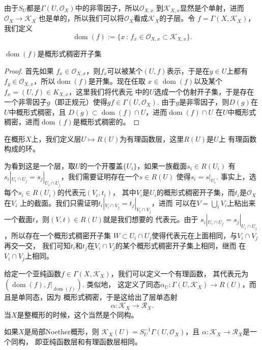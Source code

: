 由于$S_U$都是$\Gamma(U,\mathcal O_X)$中的非零因子，所以$\mathcal O_{X,x}$
到$\mathcal K_{X,x}$显然是个单射，进而$\mathcal O_{X}\to \mathcal K_{X}$
也是单的，所以我们可以将$\mathcal O_{X}$看成$\mathcal K_{X}$的子层。令
$f=\Gamma(X,\mathcal K_{X})$，我们定义
\[
    \operatorname{dom}(f):=\{x\,:\,f_x\in \mathcal O_{X,x}
    \subset \mathcal K_{X,x}\}.
\]

\begin{lem}
    $\operatorname{dom}(f)$是概形式稠密开子集
\end{lem}

\begin{proof}
首先如果
$f_x\in \mathcal O_{X,x}$，则$f_x$可以被某个$(U,f)$表示，于是在$y\in U$上都有
$f_y\in \mathcal O_{X,x}$，所以$\operatorname{dom}(f)$是开集。现在任取
$x\in \operatorname{dom}(f)$以及某个$f_x=(U,f)\in K_{X,x}$，这里我们将代表元
中的$U$选成一个仿射开子集，于是存在一个非零因子$g$（即正规元）使得$gf \in 
\Gamma(U,\mathcal O_X)$. 由于$g$是非零因子，则$D(g)$在$U$中概形式稠密，且
$D(g)\subset \operatorname{dom}(f)\cap U$，进而$\operatorname{dom}(f)\cap U$
在$U$中概形式稠密，进而$\operatorname{dom}(f)$是概形式稠密的。
\end{proof}

\para[有理函数层]
    在概形$X$上，我们定义层$U\mapsto R(U)$为有理函数层，这里$R(U)$是$U$上
    有理函数构成的环。

    为看到这是一个层，取$U$的一个开覆盖$\{U_i\}$，如果一族截面$s_i\in R(U_i)$
    有$s_i|_{U_i\cap U_j}=s_j|_{U_i\cap U_j}$，我们需要证明存在一个$s\in R(U)$
    使得$s_i=s|_{U_i}$. 事实上，选每个$s_i\in R(U_i)$的代表元$(V_i,t_i)$，
    其中$V_i$是$U_i$的概形式稠密开子集，而$t_i$是$\mathcal O_X$在$V_i$
    上的截面。我们只需证明$t_i|_{V_i\cap V_j}=t_j|_{V_i\cap V_j}$，进而
    可以在$V=\bigcup_i V_i$上粘出来一个截面$t$，则$(V,t)\in R(U)$就是我们想要的
    代表元。由于
    $s_i|_{U_i\cap U_j}=s_j|_{U_i\cap U_j}$，所以存在一个概形式稠密开子集
    $W\subset U_i\cap U_j$使得代表元在上面相同，与$V_i\cap V_j$再交一交，
    我们可知$t_i$和$t_j$在$V_i\cap V_j$的某个概形式稠密开子集上相同，继而
    在$V_i\cap V_j$上相同。
\endpara

给定一个亚纯函数$f\in \Gamma(X,\mathcal K_X)$，我们可以定义一个有理函数，
其代表元为$(\operatorname{dom}(f),f|_{\operatorname{dom}(f)})$. 类似地，
这定义了同态$\alpha_U:\Gamma(U,\mathcal K_X)\to R(U)$，而且是单同态，因为
概形式稠密，于是这给出了层单态射
\[
    \alpha:\mathcal K_X\to \mathcal R_X.
\]
当$X$是整概形的时候，这个当然是个同构。

\begin{pro}
    如果$X$是局部Noether概形，则
    $\mathcal K_X(U)=S_U^{-1}\Gamma(U,\mathcal O_X)$，且
    $\alpha:\mathcal K_X\to \mathcal R_X$是一个同构，
    即亚纯函数层和有理函数层相同。
\end{pro}

